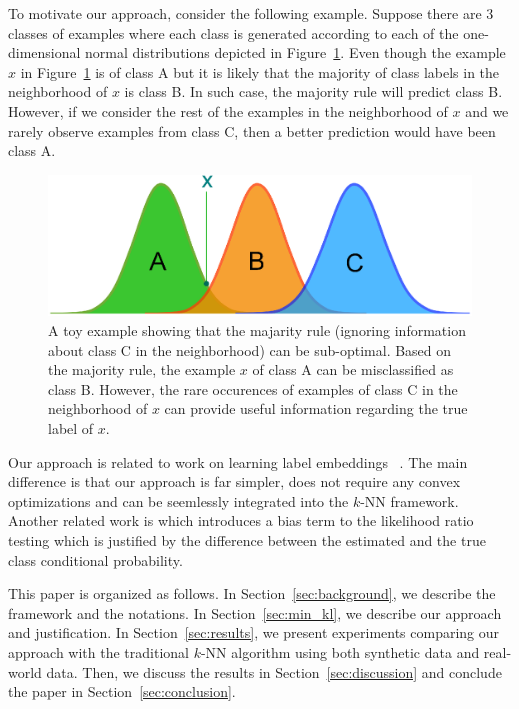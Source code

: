 \documentclass{article}
\begin{document}
To motivate our approach, consider the following example. Suppose
there are 3 classes of examples where each class is generated
according to each of the one-dimensional normal distributions depicted in
Figure~\ref{fig:toy_example}. Even though the example $x$ in
Figure~\ref{fig:toy_example} is of class A but it is likely that the
majority of class labels in the neighborhood of $x$ is class B. In
such case, the majority rule will predict class B. However, if we
consider the rest of the examples in the neighborhood of $x$ and we
rarely observe examples from class C, then a better prediction would
have been class A.

\begin{figure}[ht]
\vskip 0.2in
\begin{center}
\centerline{\includegraphics[width=\columnwidth]{figures/toy_example.eps}}
\caption{A toy example showing that the majarity rule (ignoring
  information about class C in the neighborhood) can be
  sub-optimal. Based on the majority rule, the example $x$ of class A
  can be misclassified as class B. However, the rare occurences of
  examples of class C in the neighborhood of $x$ can provide
  useful information regarding the true label of $x$.}
\label{fig:toy_example}
\end{center}
\vskip -0.2in
\end{figure} 

Our approach is related to work on learning label embeddings~
\cite{Collins2009, Bengio2010}. The main difference is that our approach is far
simpler, does not require any convex optimizations and can be
seemlessly integrated into the $k$-NN framework. Another related work
is \cite{Bilmes2001} which introduces a bias term to the likelihood ratio
testing which is justified by the difference between the estimated and
the true class conditional probability.

This paper is organized as follows. In Section~\ref{sec:background},
we describe the framework and the notations. In
Section~\ref{sec:min_kl}, we describe our approach and
justification. In Section~\ref{sec:results}, we present experiments
comparing our approach with the traditional $k$-NN algorithm using
both synthetic data and real-world data. Then, we discuss the results
in Section~\ref{sec:discussion} and conclude the paper in
Section~\ref{sec:conclusion}.
\end{document}

